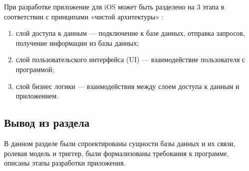При разработке приложение для iOS может быть разделено на 3 этапа в соответствии с принципами «чистой архитектуры» \cite{cleanarc}:
\begin{enumerate}
	\item слой доступа к данным --- подключение к базе данных, отправка запросов, получение информации из базы данных;
	\item слой пользовательского интерфейса (UI) --- взаимодействие пользователя с программой;
	\item слой бизнес логики --- взаимодействия между слоем доступа к данным и приложением.
\end{enumerate}


\subsection{Вывод из раздела}

В данном разделе были спроектированы сущности базы данных и их связи, ролевая модель и триггер, были формализованы требования к программе, описаны этапы разработки приложения.
